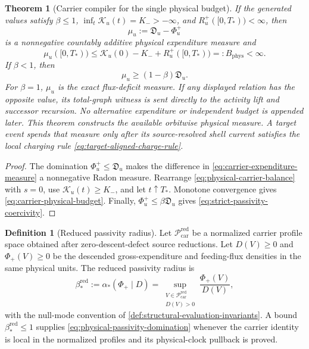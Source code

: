 \documentclass[11pt]{article}
\numberwithin{section}{part}
\theoremstyle{plain}
\newtheorem{theorem}{Theorem}[section]
\theoremstyle{definition}
\newtheorem{definition}[definition]{Definition}
\theoremstyle{remark}
\newcommand{\Phys}{\mathrm{phys}}
\newcommand{\Budget}{B_{\Phys}}
\begin{document}
\begin{theorem}[Carrier compiler for the single physical budget]
\label{thm:carrier-physical-budget}
If the generated values satisfy \(\beta\le1\),
\(\inf_t\mathcal K_u(t)=K_->-\infty\), and
\(R_u^+([0,T_*))<\infty\), then
\begin{equation}
 \label{eq:carrier-expenditure-measure}
 \mu_u:=\mathfrak D_u-\Phi_u^+
\end{equation}
is a nonnegative countably additive physical expenditure measure and
\begin{equation}
 \label{eq:carrier-physical-budget}
 \mu_u([0,T_*))
 \le
 \mathcal K_u(0)-K_-+R_u^+([0,T_*))
 =:\Budget<\infty.
\end{equation}
If \(\beta<1\), then
\begin{equation}
 \label{eq:strict-passivity-coercivity}
 \mu_u\ge(1-\beta)\mathfrak D_u.
\end{equation}
For \(\beta=1\), \(\mu_u\) is the exact flux-deficit measure.  If any displayed
relation has the opposite value, its total-graph witness is sent directly to
the activity lift and successor recursion.  No alternative expenditure or
independent budget is appended later.  This theorem constructs the available
orbitwise physical measure.  A target event spends that measure only after
its source-resolved shell current satisfies the local charging rule
\eqref{eq:target-aligned-charge-rule}.
\end{theorem}

\begin{proof}
The domination \(\Phi_u^+\le\mathfrak D_u\) makes the difference in
\eqref{eq:carrier-expenditure-measure} a nonnegative Radon measure.  Rearrange
\eqref{eq:physical-carrier-balance} with \(s=0\), use
\(\mathcal K_u(t)\ge K_-\), and let \(t\uparrow T_*\).  Monotone convergence
gives \eqref{eq:carrier-physical-budget}.  Finally,
\(\Phi_u^+\le\beta\mathfrak D_u\) gives
\eqref{eq:strict-passivity-coercivity}.
\end{proof}

\begin{definition}[Reduced passivity radius]
\label{def:reduced-passivity-radius}
Let \(\mathcal P_{\mathrm{car}}^{\mathrm{red}}\) be a normalized carrier
profile space obtained after zero-descent-defect source reductions.  Let
\(D(V)\ge0\) and \(\Phi_+(V)\ge0\) be the descended gross-expenditure and
feeding-flux densities in the same physical units.  The reduced passivity
radius is
\begin{equation}
 \label{eq:reduced-passivity-radius}
 \beta_*^{\mathrm{red}}
 :=\alpha_*(\Phi_+\mid D)
 =\sup_{\substack{V\in\mathcal P_{\mathrm{car}}^{\mathrm{red}}\\D(V)>0}}
   \frac{\Phi_+(V)}{D(V)},
\end{equation}
with the null-mode convention of
\cref{def:structural-evaluation-invariants}.  A bound
\(\beta_*^{\mathrm{red}}\le1\) supplies
\eqref{eq:physical-passivity-domination} whenever the carrier identity is
local in the normalized profiles and its physical-clock pullback is proved.
\end{definition}
\end{document}
